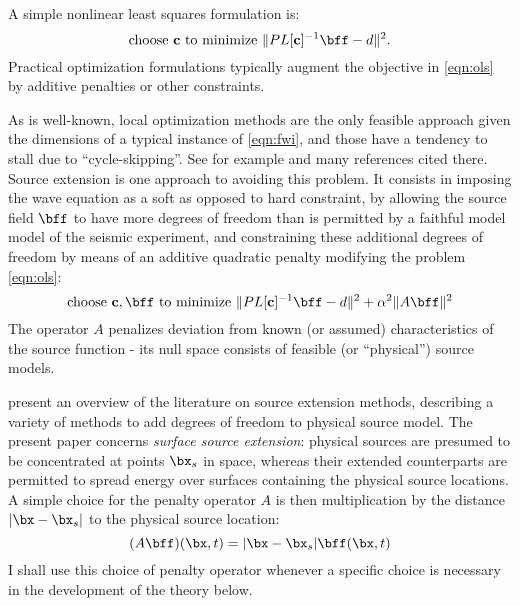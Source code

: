 A simple nonlinear least squares formulation is:
\begin{equation}
\label{eqn:ols}
\mbox{choose } {\bf c} \mbox{ to minimize } \|PL[{\bf c}]^{-1}\bff -d \|^2.
\end{equation}
Practical optimization formulations typically augment the objective in
\ref{eqn:ols} by additive penalties or other constraints.

As is well-known, local optimization methods are the only feasible
approach given the dimensions of a typical instance of \ref{eqn:fwi},
and those have a tendency to stall due to ``cycle-skipping''. See for
example \cite{VirieuxOperto:09} and many references cited there. Source
extension is one approach to avoiding this problem. It consists in
imposing the wave equation as a soft as opposed to hard constraint, by
allowing the source field $\bff$ to have more degrees of freedom than
is permitted by a faithful model model of the seismic experiment, and
constraining these additional degrees of freedom by means of an
additive quadratic penalty modifying the problem \ref{eqn:ols}:
\begin{equation}
\label{eqn:esi}
\mbox{choose } {\bf c}, \bff \mbox{ to minimize } \|PL[{\bf c}]^{-1}\bff -d \|^2 + \alpha^2 \|A\bff\|^2 
\end{equation}
The operator $A$ penalizes deviation from known (or assumed)
characteristics of the source function - its null space consists of
feasible (or ``physical'') source models.

\cite{HuangNammourSymesDollizal:SEG19} present an overview of the
literature on source extension methods, describing a variety of
methods to add degrees of freedom to physical source model. The present paper
concerns {\em surface source extension}: physical sources are
presumed to be concentrated at points $\bx_s$ in space, whereas their extended
counterparts are permitted to spread energy over surfaces containing
the physical source locations. A simple choice for the penalty
operator $A$ is then multiplication by the distance $|\bx-\bx_s|$ to the physical
source location:
\begin{equation}
  \label{eqn:penop}
  (A\bff)(\bx,t) = |\bx-\bx_s|\bff(\bx,t)
\end{equation}
I shall use this choice of penalty operator whenever a specific choice
is necessary in the development of the theory below.

